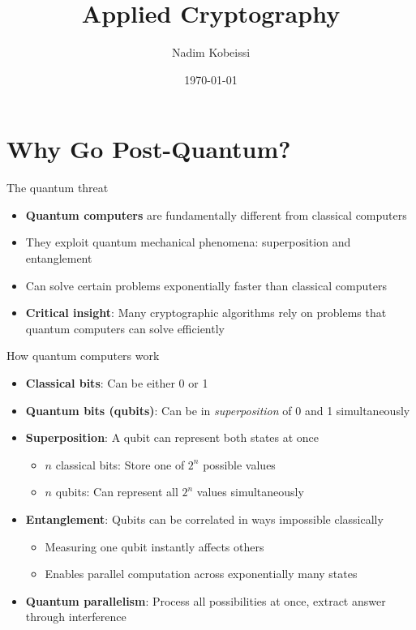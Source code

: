 \documentclass[aspectratio=169, lualatex, handout]{beamer}
\title{Applied Cryptography}
\author{Nadim Kobeissi}
\institute{American University of Beirut}
\date{\today}
\begin{document}
\begin{frame}[plain]
	\titlepage
\end{frame}

\section{Why Go Post-Quantum?}

\begin{frame}{The quantum threat}
	\begin{itemize}
		\item \textbf{Quantum computers} are fundamentally different from classical computers
		\item They exploit quantum mechanical phenomena: superposition and entanglement
		\item Can solve certain problems exponentially faster than classical computers
		\item \textbf{Critical insight}: Many cryptographic algorithms rely on problems that quantum computers can solve efficiently
	\end{itemize}
\end{frame}

\begin{frame}{How quantum computers work}
	\begin{itemize}
		\item \textbf{Classical bits}: Can be either 0 or 1
		\item \textbf{Quantum bits (qubits)}: Can be in \textit{superposition} of 0 and 1 simultaneously
		\item \textbf{Superposition}: A qubit can represent both states at once
		      \begin{itemize}
			      \item $n$ classical bits: Store one of $2^n$ possible values
			      \item $n$ qubits: Can represent all $2^n$ values simultaneously
		      \end{itemize}
		\item \textbf{Entanglement}: Qubits can be correlated in ways impossible classically
		      \begin{itemize}
			      \item Measuring one qubit instantly affects others
			      \item Enables parallel computation across exponentially many states
		      \end{itemize}
		\item \textbf{Quantum parallelism}: Process all possibilities at once, extract answer through interference
	\end{itemize}
\end{frame}
\end{document}
